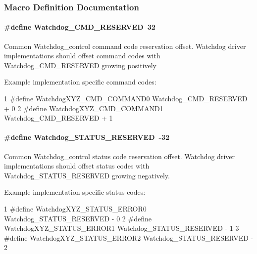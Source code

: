 \subsubsection{Macro Definition Documentation}
\paragraph[{Watchdog\+\_\+\+C\+M\+D\+\_\+\+R\+E\+S\+E\+R\+V\+E\+D}]{\setlength{\rightskip}{0pt plus 5cm}\#define Watchdog\+\_\+\+C\+M\+D\+\_\+\+R\+E\+S\+E\+R\+V\+E\+D~32}\label{group___watchdog___c_o_n_t_r_o_l_ga4d1b16e67bf555b8fe49182eb8a28b97}
Common Watchdog\+\_\+control command code reservation offset. Watchdog driver implementations should offset command codes with Watchdog\+\_\+\+C\+M\+D\+\_\+\+R\+E\+S\+E\+R\+V\+E\+D growing positively

Example implementation specific command codes\+: 
\begin{DoxyCode}
1 #define WatchdogXYZ\_CMD\_COMMAND0     Watchdog\_CMD\_RESERVED + 0
2 #define WatchdogXYZ\_CMD\_COMMAND1     Watchdog\_CMD\_RESERVED + 1
\end{DoxyCode}
\paragraph[{Watchdog\+\_\+\+S\+T\+A\+T\+U\+S\+\_\+\+R\+E\+S\+E\+R\+V\+E\+D}]{\setlength{\rightskip}{0pt plus 5cm}\#define Watchdog\+\_\+\+S\+T\+A\+T\+U\+S\+\_\+\+R\+E\+S\+E\+R\+V\+E\+D~-\/32}\label{group___watchdog___c_o_n_t_r_o_l_gaf7d1273929fd4d1f630c31b90def9684}
Common Watchdog\+\_\+control status code reservation offset. Watchdog driver implementations should offset status codes with Watchdog\+\_\+\+S\+T\+A\+T\+U\+S\+\_\+\+R\+E\+S\+E\+R\+V\+E\+D growing negatively.

Example implementation specific status codes\+: 
\begin{DoxyCode}
1 #define WatchdogXYZ\_STATUS\_ERROR0    Watchdog\_STATUS\_RESERVED - 0
2 #define WatchdogXYZ\_STATUS\_ERROR1    Watchdog\_STATUS\_RESERVED - 1
3 #define WatchdogXYZ\_STATUS\_ERROR2    Watchdog\_STATUS\_RESERVED - 2
\end{DoxyCode}
 